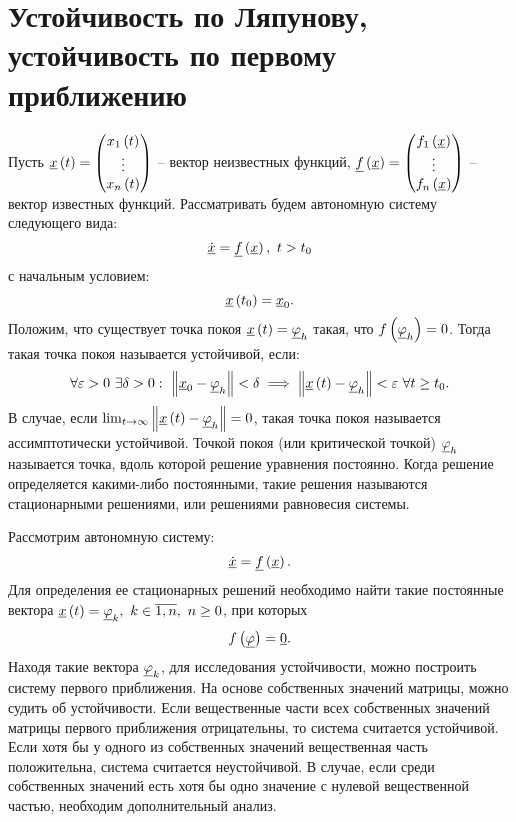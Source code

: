 \section{Устойчивость по Ляпунову, устойчивость по первому приближению}

	Пусть \( \underline{x}\left( t \right) = \begin{pmatrix} x_1\left( t \right) \\ \vdots \\ x_n\left( t \right) \end{pmatrix} \) -- вектор неизвестных функций, $\underline{f}\left( \underline{x} \right) = \begin{pmatrix} f_1 \left( \underline{x} \right) \\ \vdots \\ f_n\left( \underline{x} \right) \end{pmatrix}$ -- вектор известных функций. Рассматривать будем автономную систему следующего вида:
	\[ \underline{\dot{x}} = \underline{f}\left( \underline{x} \right), ~ t > t_0 \]
	с начальным условием:
	\[ \underline{x}\left( t_0 \right) = \underline{x}_0. \]
	Положим, что существует точка покоя $\underline{x}\left( t \right) = \underline{\varphi}_h$ такая, что $f\left( \underline{\varphi}_h \right) = 0$. Тогда такая точка покоя называется устойчивой, если:
	\[ \forall \varepsilon > 0 ~ \exists \delta > 0: ~ \left\Vert \underline{x}_0 - \underline{\varphi}_h \right\Vert < \delta \implies \left\Vert \underline{x}\left( t \right) - \underline{\varphi}_h \right\Vert < \varepsilon ~ \forall t \ge t_0. \]
	В случае, если $\lim_{t \to \infty} \left\Vert \underline{x}\left( t \right) - \underline{\varphi}_h \right\Vert = 0$, такая точка покоя называется ассимптотически устойчивой.
	Точкой покоя (или критической точкой) $\underline{\varphi}_h$ называется точка, вдоль которой решение уравнения постоянно. Когда решение определяется какими-либо постоянными, такие решения называются стационарными решениями, или решениями равновесия системы.

	Рассмотрим автономную систему:
	\[ \underline{\dot{x}} = \underline{f}\left( \underline{x} \right). \]
	Для определения ее стационарных решений необходимо найти такие постоянные вектора $\underline{x}\left( t \right) = \underline{\varphi}_k, ~ k \in \overline{1, n}, ~ n \ge 0$, при которых
	\[ f\left( \underline{\varphi} \right) = \underline{0}. \]
	Находя такие вектора $\underline{\varphi}_k$, для исследования устойчивости, можно построить систему первого приближения. На основе собственных значений матрицы, можно судить об устойчивости. Если вещественные части всех собственных значений матрицы первого приближения отрицательны, то система считается устойчивой. Если хотя бы у одного из собственных значений вещественная часть положительна, система считается неустойчивой. В случае, если среди собственных значений есть хотя бы одно значение с нулевой вещественной частью, необходим дополнительный анализ.

